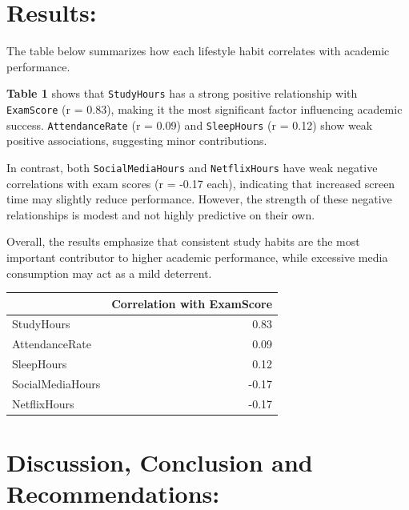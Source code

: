\documentclass[
  11pt,
  a4paper,
]{article}
\begin{document}
\newpage

\section{Results:}\label{results}

The table below summarizes how each lifestyle habit correlates with
academic performance.

\textbf{Table 1} shows that \texttt{StudyHours} has a strong positive
relationship with \texttt{ExamScore} (r = 0.83), making it the most
significant factor influencing academic success. \texttt{AttendanceRate}
(r = 0.09) and \texttt{SleepHours} (r = 0.12) show weak positive
associations, suggesting minor contributions.

In contrast, both \texttt{SocialMediaHours} and \texttt{NetflixHours}
have weak negative correlations with exam scores (r = -0.17 each),
indicating that increased screen time may slightly reduce performance.
However, the strength of these negative relationships is modest and not
highly predictive on their own.

Overall, the results emphasize that consistent study habits are the most
important contributor to higher academic performance, while excessive
media consumption may act as a mild deterrent.

\begin{longtable}[]{@{}lr@{}}
\toprule\noalign{}
& Correlation with ExamScore \\
\midrule\noalign{}
\endhead
\bottomrule\noalign{}
\endlastfoot
StudyHours & 0.83 \\
AttendanceRate & 0.09 \\
SleepHours & 0.12 \\
SocialMediaHours & -0.17 \\
NetflixHours & -0.17 \\
\end{longtable}

\newpage

\section{Discussion, Conclusion and
Recommendations:}\label{discussion-conclusion-and-recommendations}
\end{document}
